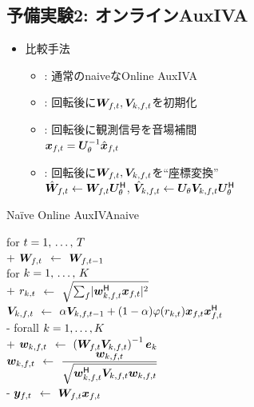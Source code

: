 \documentclass[twocolumn,9pt,dvipdfmx]{article}
\begin{document}
\subsection*{予備実験2: オンラインAuxIVA}
\begin{itemize}
  \item 比較手法
    \begin{itemize}
      \item {}: 通常のnaiveなOnline AuxIVA
      \item {}: 回転後に$\Demix _{\ft}, \cov _{\src,\ft}$を初期化
      \item {}: 回転後に観測信号を音場補間\\
        $\Obs _{\ft} = \rotMat _{\rotDeg} ^{-1} \rotObs _{\ft}$
      \item {}: 回転後に$\Demix _{\ft}, \cov _{\src,\ft}$を``座標変換''\\
        $\rotDemix _{\ft} \gets \Demix _{\ft} \rotMat _{\rotDeg} ^{\hermite}$,\; $\rotCov _{\src,\ft} \gets \rotMat _{\rotDeg} \cov _{\src,\ft} \rotMat _{\rotDeg} ^{\hermite}$
    \end{itemize}
\end{itemize}

\begin{algorithm}{Na\"{i}ve Online AuxIVA}{naive}
  \begin{pseudo}
    for $t = 1,\, \dots,\, T$ \\+
      {$\Demix _{\ft}$} $\gets$ $\Demix _{\ft[-1]}$ \ct{$(\forall \freq)$} \\
      for $k = 1,\, \dots,\, K$ \\+
        {$r _{k,t}$} $\gets$ $\sqrt{\sum _{\freq} \abs{\demix _{\src,\ft} ^{\hermite} \Obs _{\ft}} ^2}$ \\
        {$\cov _{\src,\ft}    $} $\gets$ $\forget \cov _{\src,\ft[-1]} + (1 - \forget) \weight(\var _{\src,\tframe}) \Obs _{\ft} \Obs _{\ft} ^{\hermite}$ \ct{$(\forall \freq)$}\\-
      forall $k = 1, \dots, K$ \\+
        {$\demix _{\src,\ft}$} $\gets$ $\left(\Demix _{\ft} \cov _{\src,\ft}\right) ^{-1} \eye _{\src}$ \ct{$(\forall \freq)$}\\
        {$\demix _{\src,\ft}$} $\gets$ $\dfrac{\demix _{\src,\ft}}{\sqrt{\demix _{\src,\ft} ^{\hermite} \cov _{\src,\ft} \demix _{\src,\ft}}}$ \ct{$(\forall \freq)$} \\-
        {$\Est _{\ft}  $} $\gets$ $\Demix _{\ft} \Obs _{\ft}$ \ct{$(\forall \freq)$}
  \end{pseudo}
\end{algorithm}
\end{document}
